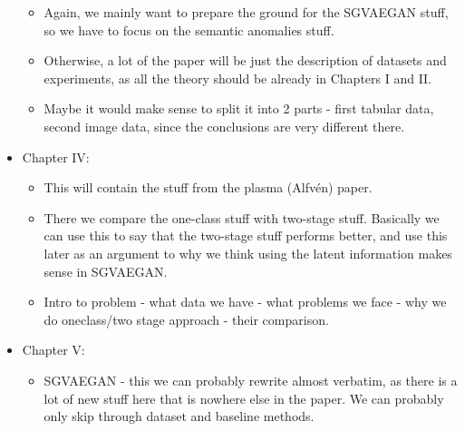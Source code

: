\documentclass[twoside, a4paper, 12pt]{book}
\begin{document}
\begin{itemize}
\begin{itemize}
			\item Again, we mainly want to prepare the ground for the SGVAEGAN stuff, so we have to focus on the semantic anomalies stuff.
			\item Otherwise, a lot of the paper will be just the description of datasets and experiments, as all the theory should be already in Chapters I and II.
			\item Maybe it would make sense to split it into 2 parts - first tabular data, second image data, since the conclusions are very different there.
		\end{itemize}
	\item Chapter IV: 
		\begin{itemize}
			\item This will contain the stuff from the plasma (Alfvén) paper.
			\item There we compare the one-class stuff with two-stage stuff. Basically we can use this to say that the two-stage stuff performs better, and use this later as an argument to why we think using the latent information makes sense in SGVAEGAN.
			\item Intro to problem - what data we have - what problems we face - why we do oneclass/two stage approach - their comparison.
		\end{itemize}
	\item Chapter V: 
		\begin{itemize}
			\item SGVAEGAN - this we can probably rewrite almost verbatim, as there is a lot of new stuff here that is nowhere else in the paper. We can probably only skip through dataset and baseline methods.
		\end{itemize}

\end{itemize}

\begin{theorem}
    \lipsum[5]
\end{theorem}

\begin{example}
    \lipsum[5]
\end{example}











\end{document}
